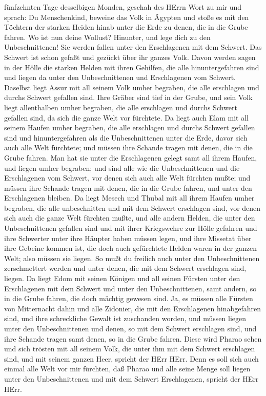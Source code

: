 fünfzehnten Tage desselbigen Monden, geschah des HErrn Wort zu mir und
sprach:  Du Menschenkind, beweine das Volk in Ägypten und
stoße es mit den Töchtern der starken Heiden hinab unter die Erde zu
denen, die in die Grube fahren.  Wo ist nun deine Wollust?
Hinunter, und lege dich zu den Unbeschnittenen!  Sie werden
fallen unter den Erschlagenen mit dem Schwert. Das Schwert ist schon
gefaßt und gezückt über ihr ganzes Volk.  Davon werden
sagen in der Hölle die starken Helden mit ihren Gehilfen, die alle
hinuntergefahren sind und liegen da unter den Unbeschnittenen und
Erschlagenen vom Schwert.  Daselbst liegt Assur mit all
seinem Volk umher begraben, die alle erschlagen und durchs Schwert
gefallen sind.  Ihre Gräber sind tief in der Grube, und
sein Volk liegt allenthalben umher begraben, die alle erschlagen und
durchs Schwert gefallen sind, da sich die ganze Welt vor fürchtete.
 Da liegt auch Elam mit all seinem Haufen umher begraben,
die alle erschlagen und durchs Schwert gefallen sind und
hinuntergefahren als die Unbeschnittenen unter die Erde, davor sich auch
alle Welt fürchtete; und müssen ihre Schande tragen mit denen, die in
die Grube fahren.  Man hat sie unter die Erschlagenen
gelegt samt all ihrem Haufen, und liegen umher begraben; und sind alle
wie die Unbeschnittenen und die Erschlagenen vom Schwert, vor denen sich
auch alle Welt fürchten mußte; und müssen ihre Schande tragen mit denen,
die in die Grube fahren, und unter den Erschlagenen bleiben.
 Da liegt Mesech und Thubal mit all ihrem Haufen umher
begraben, die alle unbeschnitten und mit dem Schwert erschlagen sind,
vor denen sich auch die ganze Welt fürchten mußte,  und
alle andern Helden, die unter den Unbeschnittenen gefallen sind und mit
ihrer Kriegswehre zur Hölle gefahren und ihre Schwerter unter ihre
Häupter haben müssen legen, und ihre Missetat über ihre Gebeine kommen
ist, die doch auch gefürchtete Helden waren in der ganzen Welt; also
müssen sie liegen.  So mußt du freilich auch unter den
Unbeschnittenen zerschmettert werden und unter denen, die mit dem
Schwert erschlagen sind, liegen.  Da liegt Edom mit seinen
Königen und all seinen Fürsten unter den Erschlagenen mit dem Schwert
und unter den Unbeschnittenen, samt andern, so in die Grube fahren, die
doch mächtig gewesen sind.  Ja, es müssen alle Fürsten von
Mitternacht dahin und alle Zidonier, die mit den Erschlagenen
hinabgefahren sind, und ihre schreckliche Gewalt ist zuschanden worden,
und müssen liegen unter den Unbeschnittenen und denen, so mit dem
Schwert erschlagen sind, und ihre Schande tragen samt denen, so in die
Grube fahren.  Diese wird Pharao sehen und sich trösten mit
all seinem Volk, die unter ihm mit dem Schwert erschlagen sind, und mit
seinem ganzen Heer, spricht der HErr HErr.  Denn es soll
sich auch einmal alle Welt vor mir fürchten, daß Pharao und alle seine
Menge soll liegen unter den Unbeschnittenen und mit dem Schwert
Erschlagenen, spricht der HErr HErr.

